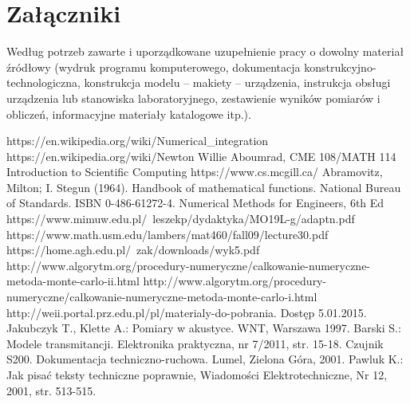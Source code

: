 \documentclass[12pt,twoside]{article}
\begin{document}
\section*{Załączniki}

Według potrzeb zawarte i uporządkowane uzupełnienie pracy o dowolny materiał źródłowy (wydruk programu komputerowego, dokumentacja kons\-truk\-cyj\-no-\-tech\-no\-lo\-gicz\-na, konstrukcja modelu -- makiety -- urządzenia, instrukcja obsługi urządzenia lub stanowiska laboratoryjnego, zestawienie wyników pomiarów i obliczeń, informacyjne materiały katalogowe itp.).


\clearpage


\begin{thebibliography}{4}
 https://en.wikipedia.org/wiki/Numerical\_integration
 https://en.wikipedia.org/wiki/Newton%
 Willie Aboumrad, CME 108/MATH 114 Introduction to Scientific Computing
 https://www.cs.mcgill.ca/
 Abramovitz, Milton; I. Stegun (1964). Handbook of mathematical functions. National Bureau of Standards. ISBN 0-486-61272-4.
 Numerical Methods for Engineers, 6th Ed
 https://www.mimuw.edu.pl/~leszekp/dydaktyka/MO19L-g/adaptn.pdf
 https://www.math.usm.edu/lambers/mat460/fall09/lecture30.pdf
 https://home.agh.edu.pl/~zak/downloads/wyk5.pdf
 http://www.algorytm.org/procedury-numeryczne/calkowanie-numeryczne-metoda-monte-carlo-ii.html
 http://www.algorytm.org/procedury-numeryczne/calkowanie-numeryczne-metoda-monte-carlo-i.html
 http://weii.portal.prz.edu.pl/pl/materialy-do-pobrania. Dostęp 5.01.2015.
 Jakubczyk T., Klette A.: Pomiary w akustyce. WNT, Warszawa 1997.
 Barski S.: Modele transmitancji. Elektronika praktyczna, nr 7/2011, str. 15-18.
 Czujnik S200. Dokumentacja techniczno-ruchowa. Lumel, Zielona Góra, 2001.
 Pawluk K.: Jak pisać teksty techniczne poprawnie, Wiadomości Elektrotechniczne, Nr 12, 2001, str. 513-515.
\end{thebibliography}

\clearpage

\makesummary
\end{document}
